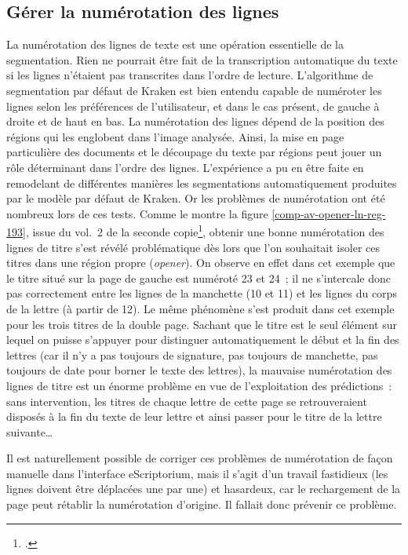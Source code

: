 \documentclass[a4paper,12pt,twoside]{book}
\begin{document}
			\subsection{Gérer la numérotation des lignes}
				La numérotation des lignes de texte est une opération essentielle de la \gls{segmentation}. Rien ne pourrait être fait de la transcription automatique du texte si les lignes n'étaient pas transcrites dans l'ordre de lecture. L'algorithme de \gls{segmentation} par défaut de Kraken est bien entendu capable de numéroter les lignes selon les préférences de l'utilisateur, et dans le cas présent, de gauche à droite et de haut en bas. La numérotation des lignes dépend de la position des régions qui les englobent dans l'image analysée. Ainsi, la mise en page particulière des documents et le découpage du texte par régions peut jouer un rôle déterminant dans l'ordre des lignes. L'expérience a pu en être faite en remodelant de différentes manières les \glspl{segmentation} automatiquement produites par le modèle par défaut de Kraken.				
				Or les problèmes de numérotation ont été nombreux lors de ces tests. Comme le montre la figure \ref{comp-av-opener-ln-reg-193}, issue du vol.~2 de la seconde copie\footcite{CdS02001369}, obtenir une bonne numérotation des lignes de titre s'est révélé problématique dès lors que l'on souhaitait isoler ces titres dans une région propre (\textit{opener}). On observe en effet dans cet exemple que le titre situé sur la page de gauche est numéroté 23 et 24~; il ne s'intercale donc pas correctement entre les lignes de la manchette (10 et 11) et les lignes du corps de la lettre (à partir de 12). Le même phénomène s'est produit dans cet exemple pour les trois titres de la double page. Sachant que le titre est le seul élément sur lequel on puisse s'appuyer pour distinguer automatiquement le début et la fin des lettres (car il n'y a pas toujours de signature, pas toujours de manchette, pas toujours de date pour borner le texte des lettres), la mauvaise numérotation des lignes de titre est un énorme problème en vue de l'exploitation des \glspl{prédiction}~: sans intervention, les titres de chaque lettre de cette page se retrouveraient disposés à la fin du texte de leur lettre et ainsi passer pour le titre de la lettre suivante…
				
				Il est naturellement possible de corriger ces problèmes de numérotation de façon manuelle dans l'interface eScriptorium, mais il s'agit d'un travail fastidieux (les lignes doivent être déplacées une par une) et hasardeux, car le rechargement de la page peut rétablir la  numérotation d'origine. Il fallait donc prévenir ce problème.
				
\end{document}
